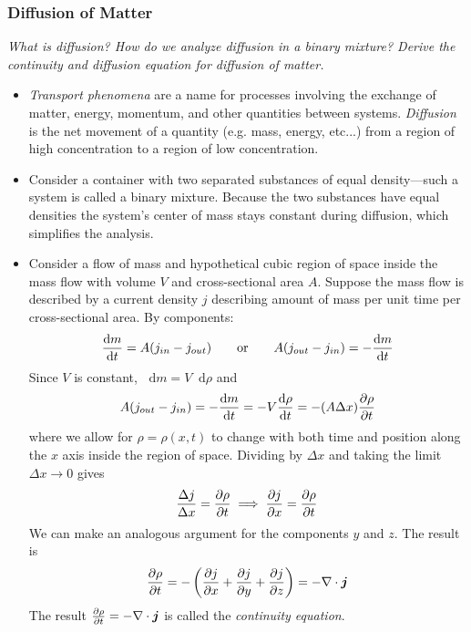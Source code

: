 \documentclass[11pt, a4paper]{article}
\newcommand{\eqtext}[1]{\qquad \text{#1} \qquad}
\newcommand{\diff}{\mathop{}\!\mathrm{d}} %
\begin{document}
\subsubsection{Diffusion of Matter}
\textit{What is diffusion? How do we analyze diffusion in a binary mixture? Derive the continuity and diffusion equation for diffusion of matter.} 

\begin{itemize}
	\item \textit{Transport phenomena} are a name for processes involving the exchange of matter, energy, momentum, and other quantities between systems. \textit{Diffusion} is the net movement of a quantity (e.g. mass, energy, etc...) from a region of high concentration to a region of low concentration. 
	
	\item Consider a container with two separated substances of equal density---such a system is called a binary mixture. Because the two substances have equal densities the system's center of mass stays constant during diffusion, which simplifies the analysis.
	
	\item Consider a flow of mass and hypothetical cubic region of space inside the mass flow with volume $ V $ and cross-sectional area $ A $. Suppose the mass flow is described by a current density $ j $ describing amount of mass per unit time per cross-sectional area. By components:
	\begin{equation*}
		\dv{m}{t} = A(j_{in} - j_{out}) \eqtext{or} A(j_{out} - j_{in}) = - \dv{m}{t}
	\end{equation*}
	Since $ V $ is constant, $ \diff m = V \diff \rho $ and
	\begin{equation*}
		 A(j_{out} - j_{in}) = - \dv{m}{t} = - V\dv{\rho}{t} = - (A \Delta x) \pdv{\rho}{t}
	\end{equation*}
	where we allow for $ \rho = \rho (x, t) $ to change with both time and position along the $ x $ axis inside the region of space. Dividing by $ \Delta x $ and taking the limit $ \Delta x \to 0 $ gives
	\begin{equation*}
		\frac{\Delta j}{\Delta x} = \pdv{\rho}{t} \implies \pdv{j}{x} = \pdv{\rho}{t}
	\end{equation*}
	We can make an analogous argument for the components $ y $ and $ z $. The result is
	\begin{equation*}
		\pdv{\rho}{t} = - \left(\pdv{j}{x} + \pdv{j}{y} + \pdv{j}{z}\right) = - \nabla \cdot \bm{j}
	\end{equation*}
	The result $ \pdv{\rho}{t} = - \nabla \cdot \bm{j} $ is called the \textit{continuity equation}.
	

\end{itemize}
\end{document}
